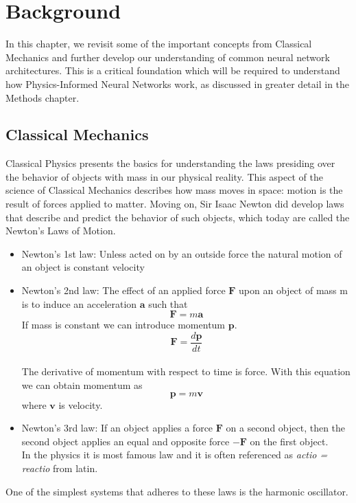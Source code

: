 \chapter{Background}\label{background}
In this chapter, we revisit some of the important concepts from Classical Mechanics and further develop our understanding of common neural network architectures. This is a critical foundation which will be required to understand how Physics-Informed Neural Networks work, as discussed in greater detail in the Methods chapter. 
\section{Classical Mechanics}\label{cs}
Classical Physics presents the basics for understanding the laws presiding over the behavior of objects with mass in our physical reality. This aspect of the science of Classical Mechanics describes how mass moves in space: motion is the result of forces applied to matter. Moving on, Sir Isaac Newton did develop laws that describe and predict the behavior of such objects, which today are called the Newton's Laws of Motion.\cite{ClassPhy}
\begin{itemize}
	\item Newton's 1st law: Unless acted on by an outside force the natural motion of an object is constant velocity
	\item Newton’s 2nd law: The effect of an applied force $\mathbf{F}$ upon an object of mass
	m is to induce an acceleration $\mathbf{a}$ such that $$\mathbf{F}=m\mathbf{a}$$
	If mass is constant we can introduce momentum $\mathbf{p}$.
	$$\mathbf{F}=\frac{d\mathbf{p}}{dt}$$ \\
	The derivative of momentum with respect to time is force. 
	With this equation we can obtain momentum as $$\mathbf{p}=m\mathbf{v}$$ where $\mathbf{v}$ is velocity.
	\item Newton’s 3rd law: If an object applies a force $\mathbf{F}$ on a second object, then the second object applies an equal and opposite force $-\mathbf{F}$ on the first object.\\
	In the physics it is most famous law and it is often referenced as  \textit{actio = reactio} from latin.
\end{itemize}
One of the simplest systems that adheres to these laws is the harmonic oscillator.
